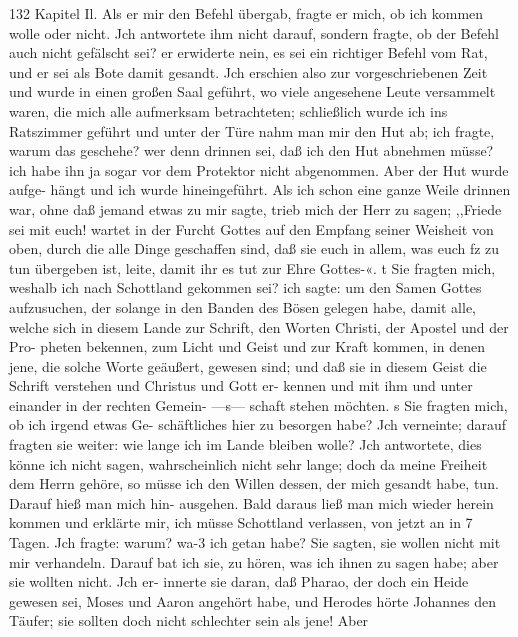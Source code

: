 132 Kapitel Il.
Als er mir den Befehl übergab, fragte er mich, ob ich kommen
wolle oder nicht. Jch antwortete ihm nicht darauf, sondern
fragte, ob der Befehl auch nicht gefälscht sei? er erwiderte nein,
es sei ein richtiger Befehl vom Rat, und er sei als Bote damit
gesandt. Jch erschien also zur vorgeschriebenen Zeit und wurde in
einen großen Saal geführt, wo viele angesehene Leute versammelt
waren, die mich alle aufmerksam betrachteten; schließlich wurde
ich ins Ratszimmer geführt und unter der Türe nahm man mir
den Hut ab; ich fragte, warum das geschehe? wer denn drinnen
sei, daß ich den Hut abnehmen müsse? ich habe ihn ja sogar vor
dem Protektor nicht abgenommen. Aber der Hut wurde aufge-
hängt und ich wurde hineingeführt. Als ich schon eine ganze
Weile drinnen war, ohne daß jemand etwas zu mir sagte, trieb
mich der Herr zu sagen; ,,Friede sei mit euch! wartet in der
Furcht Gottes auf den Empfang seiner Weisheit von oben, durch
die alle Dinge geschaffen sind, daß sie euch in allem, was euch
fz zu tun übergeben ist, leite, damit ihr es tut zur Ehre Gottes-«.
t Sie fragten mich, weshalb ich nach Schottland gekommen sei? ich
sagte: um den Samen Gottes aufzusuchen, der solange in den
Banden des Bösen gelegen habe, damit alle, welche sich in diesem
Lande zur Schrift, den Worten Christi, der Apostel und der Pro-
pheten bekennen, zum Licht und Geist und zur Kraft kommen, in
denen jene, die solche Worte geäußert, gewesen sind; und daß sie
in diesem Geist die Schrift verstehen und Christus und Gott er-
kennen und mit ihm und unter einander in der rechten Gemein-
—s— schaft stehen möchten. s Sie fragten mich, ob ich irgend etwas Ge-
schäftliches hier zu besorgen habe? Jch verneinte; darauf fragten
sie weiter: wie lange ich im Lande bleiben wolle? Jch antwortete,
dies könne ich nicht sagen, wahrscheinlich nicht sehr lange; doch
da meine Freiheit dem Herrn gehöre, so müsse ich den Willen
dessen, der mich gesandt habe, tun. Darauf hieß man mich hin-
ausgehen. Bald daraus ließ man mich wieder herein kommen
und erklärte mir, ich müsse Schottland verlassen, von jetzt an in
7 Tagen. Jch fragte: warum? wa-3 ich getan habe? Sie sagten,
sie wollen nicht mit mir verhandeln. Darauf bat ich sie, zu hören,
was ich ihnen zu sagen habe; aber sie wollten nicht. Jch er-
innerte sie daran, daß Pharao, der doch ein Heide gewesen sei,
Moses und Aaron angehört habe, und Herodes hörte Johannes
den Täufer; sie sollten doch nicht schlechter sein als jene! Aber


